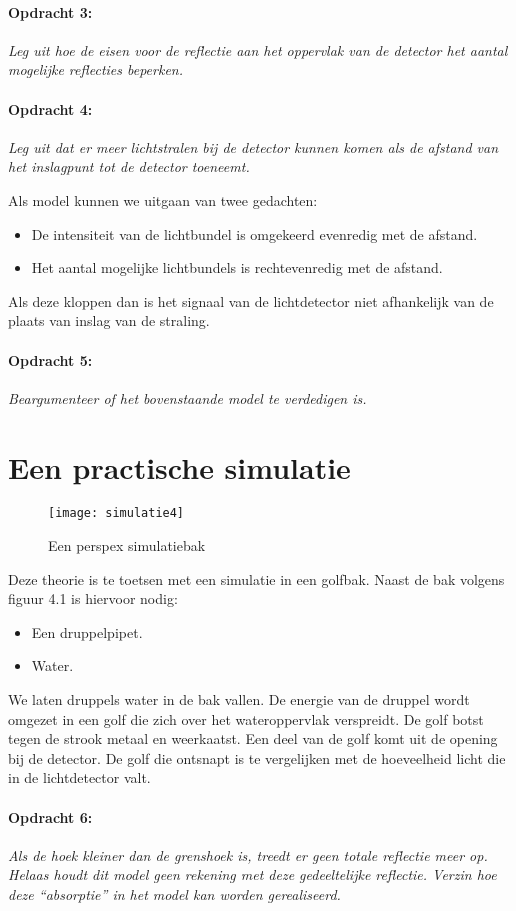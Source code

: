 \paragraph*{Opdracht 3:}

\emph{Leg uit hoe de eisen voor de reflectie aan het oppervlak van
de detector het aantal mogelijke reflecties beperken.}


\paragraph*{Opdracht 4:}

\emph{Leg uit dat er meer lichtstralen bij de detector kunnen komen
als de afstand van het inslagpunt tot de detector toeneemt.}

Als model kunnen we uitgaan van twee gedachten:
\begin{itemize}
\item De intensiteit van de lichtbundel is omgekeerd evenredig met de afstand.
\item Het aantal mogelijke lichtbundels is rechtevenredig met de afstand.
\end{itemize}
Als deze kloppen dan is het signaal van de lichtdetector niet afhankelijk
van de plaats van inslag van de straling.


\paragraph*{Opdracht 5:}

\emph{Beargumenteer of het bovenstaande model te verdedigen is. }


\section{Een practische simulatie}

\begin{figure}[h]
\noindent \begin{centering}
\texttt{[image: simulatie4]}
\par\end{centering}

\caption{Een perspex simulatiebak}
\end{figure}


Deze theorie is te toetsen met een simulatie in een golfbak. Naast
de bak volgens figuur 4.1 is hiervoor nodig:
\begin{itemize}
\item Een druppelpipet.
\item Water.
\end{itemize}
We laten druppels water in de bak vallen. De energie van de druppel
wordt omgezet in een golf die zich over het wateroppervlak verspreidt.
De golf botst tegen de strook metaal en weerkaatst. Een deel van de
golf komt uit de opening bij de detector. De golf die ontsnapt is
te vergelijken met de hoeveelheid licht die in de lichtdetector valt.


\paragraph*{Opdracht 6:}

\emph{Als de hoek kleiner dan de grenshoek is, treedt er geen totale
reflectie meer op. Helaas houdt dit model geen rekening met deze
gedeeltelijke reflectie. Verzin hoe deze ``absorptie'' in het model kan
worden gerealiseerd.}


